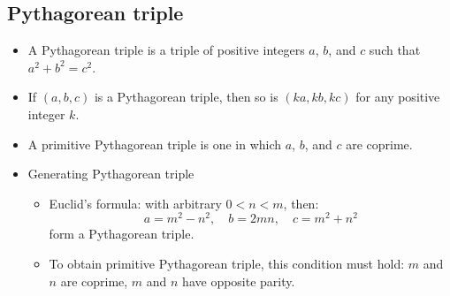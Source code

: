 \subsection{Pythagorean triple}
\begin{itemize}[leftmargin=*]
  \item A Pythagorean triple is a triple of positive integers $a$, $b$, and $c$ such that $a^2 + b^2 = c^2$.
  \item If $(a, b, c)$ is a Pythagorean triple, then so is $(ka, kb, kc)$ for any positive integer $k$.
  \item A primitive Pythagorean triple is one in which $a$, $b$, and $c$ are coprime.
  \item Generating Pythagorean triple
  \begin{itemize}[leftmargin=0.25cm]
    \item Euclid's formula: with arbitrary $0 < n < m$, then: $$a = m^2 - n^2, \quad b = 2mn,\quad c = m^2 + n^2$$ form a Pythagorean triple.
    \item To obtain primitive Pythagorean triple, this condition must hold: $m$ and $n$ are coprime, $m$ and $n$ have opposite parity.
  \end{itemize}
\end{itemize}
